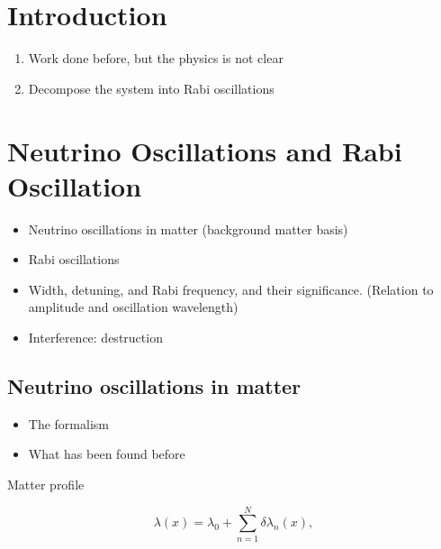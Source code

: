 \documentclass[%
preprint,
 amsmath,amssymb,
 aps,
]{revtex4-1}
\begin{document}
\maketitle


\section{\label{introduction}Introduction}

\begin{enumerate}
    \item Work done before, but the physics is not clear
    \item Decompose the system into Rabi oscillations
\end{enumerate}


\section{\label{rabi}Neutrino Oscillations and Rabi Oscillation}



\begin{itemize}
    \item Neutrino oscillations in matter (background matter basis)
    \item Rabi oscillations
    \item Width, detuning, and Rabi frequency, and their significance. (Relation to amplitude and oscillation wavelength)
    \item Interference: destruction
\end{itemize}


\subsection{Neutrino oscillations in matter}


\begin{itemize}
    \item The formalism
    \item What has been found before
\end{itemize}


Matter profile

\begin{equation}
    \lambda(x) = \lambda_0 + \sum_{n=1}^{N} \delta \lambda_n (x),
\end{equation}
\end{document}

